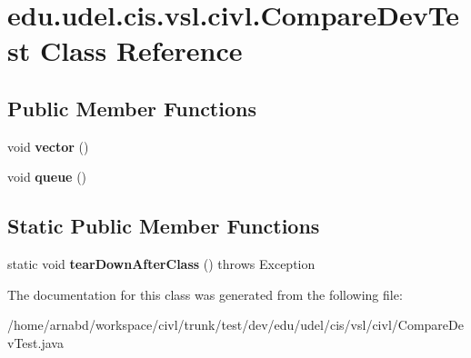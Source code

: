 \hypertarget{classedu_1_1udel_1_1cis_1_1vsl_1_1civl_1_1CompareDevTest}{}\section{edu.\+udel.\+cis.\+vsl.\+civl.\+Compare\+Dev\+Test Class Reference}
\label{classedu_1_1udel_1_1cis_1_1vsl_1_1civl_1_1CompareDevTest}
\subsection*{Public Member Functions}
\begin{DoxyCompactItemize}
\item 
\hypertarget{classedu_1_1udel_1_1cis_1_1vsl_1_1civl_1_1CompareDevTest_a87c161d7d00c63ae60014225b9e565ce}{}void {\bfseries vector} ()\label{classedu_1_1udel_1_1cis_1_1vsl_1_1civl_1_1CompareDevTest_a87c161d7d00c63ae60014225b9e565ce}

\item 
\hypertarget{classedu_1_1udel_1_1cis_1_1vsl_1_1civl_1_1CompareDevTest_ae160c1fffbaf1e1b21d16518866882e9}{}void {\bfseries queue} ()\label{classedu_1_1udel_1_1cis_1_1vsl_1_1civl_1_1CompareDevTest_ae160c1fffbaf1e1b21d16518866882e9}

\end{DoxyCompactItemize}
\subsection*{Static Public Member Functions}
\begin{DoxyCompactItemize}
\item 
\hypertarget{classedu_1_1udel_1_1cis_1_1vsl_1_1civl_1_1CompareDevTest_af5de7453bef992f80754ac2600fcea0b}{}static void {\bfseries tear\+Down\+After\+Class} ()  throws Exception \label{classedu_1_1udel_1_1cis_1_1vsl_1_1civl_1_1CompareDevTest_af5de7453bef992f80754ac2600fcea0b}

\end{DoxyCompactItemize}


The documentation for this class was generated from the following file\+:\begin{DoxyCompactItemize}
\item 
/home/arnabd/workspace/civl/trunk/test/dev/edu/udel/cis/vsl/civl/Compare\+Dev\+Test.\+java\end{DoxyCompactItemize}
